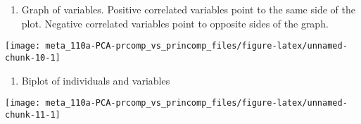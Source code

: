 \documentclass[]{book}
\newenvironment{Shaded}{\begin{snugshade}}{\end{snugshade}}
\newcommand{\CommentTok}[1]{\textcolor[rgb]{0.56,0.35,0.01}{\textit{#1}}}
\newcommand{\DataTypeTok}[1]{\textcolor[rgb]{0.13,0.29,0.53}{#1}}
\newcommand{\KeywordTok}[1]{\textcolor[rgb]{0.13,0.29,0.53}{\textbf{#1}}}
\newcommand{\NormalTok}[1]{#1}
\newcommand{\OtherTok}[1]{\textcolor[rgb]{0.56,0.35,0.01}{#1}}
\newcommand{\StringTok}[1]{\textcolor[rgb]{0.31,0.60,0.02}{#1}}
\providecommand{\tightlist}{%
  \setlength{\itemsep}{0pt}\setlength{\parskip}{0pt}}
\begin{document}
\begin{enumerate}
\def\labelenumi{\arabic{enumi}.}
\setcounter{enumi}{4}
\tightlist
\item
  Graph of variables. Positive correlated variables point to the same side of the plot. Negative correlated variables point to opposite sides of the graph.
\end{enumerate}

\begin{Shaded}
\end{Shaded}

\begin{center}\texttt{[image: meta\_110a-PCA-prcomp\_vs\_princomp\_files/figure-latex/unnamed-chunk-10-1]} \end{center}

\begin{enumerate}
\def\labelenumi{\arabic{enumi}.}
\setcounter{enumi}{5}
\tightlist
\item
  Biplot of individuals and variables
\end{enumerate}

\begin{Shaded}
\end{Shaded}

\begin{center}\texttt{[image: meta\_110a-PCA-prcomp\_vs\_princomp\_files/figure-latex/unnamed-chunk-11-1]} \end{center}
\end{document}
